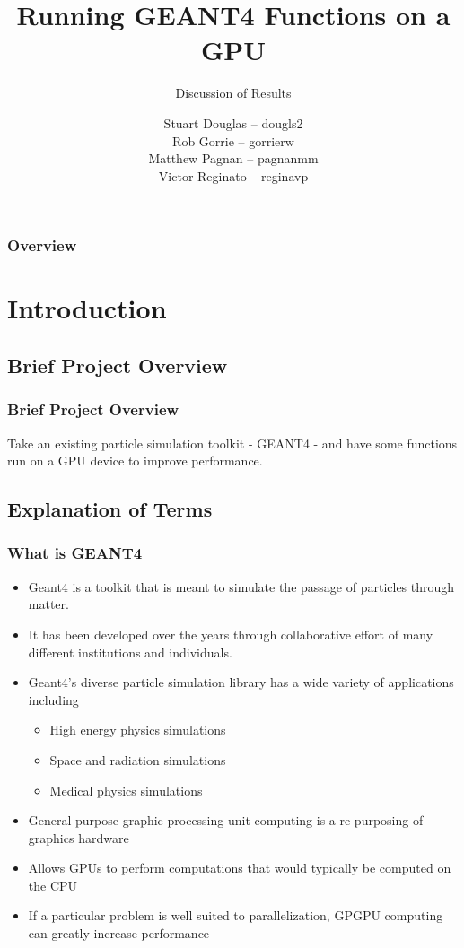\documentclass{beamer}
\title[GEANT4-GPU (McMaster University)]{Running GEANT4 Functions on a GPU}
\subtitle{Discussion of Results}
\institute{McMaster University}
\author[S. Douglas, R. Gorrie, M .Pagnan, V. Reginato]{
Stuart Douglas -- dougls2
\\Rob Gorrie -- gorrierw
\\Matthew Pagnan -- pagnanmm
\\Victor Reginato -- reginavp
}
\begin{document}
\frame{\titlepage}
\begin{frame}
\frametitle{Overview}
\tableofcontents
\end{frame}

\section{Introduction} 

\subsection{Brief Project Overview}
\begin{frame}
\frametitle{Brief Project Overview}
Take an existing particle simulation toolkit - GEANT4 - and have some functions run on a GPU device to improve performance.
\end{frame}

\subsection{Explanation of Terms}
\begin{frame}
\frametitle{What is GEANT4}
\begin{itemize}
\item Geant4 is a toolkit that is meant to simulate the passage of particles through matter. 
\item It has been developed over the years through collaborative effort of many different institutions and individuals. 
\item Geant4's diverse particle simulation library has a wide variety of applications including
\begin{itemize}
\item High energy physics simulations
\item Space and radiation simulations
\item Medical physics simulations
\end{itemize}
\end{itemize}
\end{frame}

\begin{frame}
\begin{itemize}
\frametitle{What is GP-GPU}
\item General purpose graphic processing unit computing is a re-purposing of graphics hardware
\item Allows GPUs  to perform computations that would typically be computed on the CPU
\item If a particular problem is well suited to parallelization, GPGPU computing can greatly increase performance
\end{itemize}
\end{frame}
\end{document}
